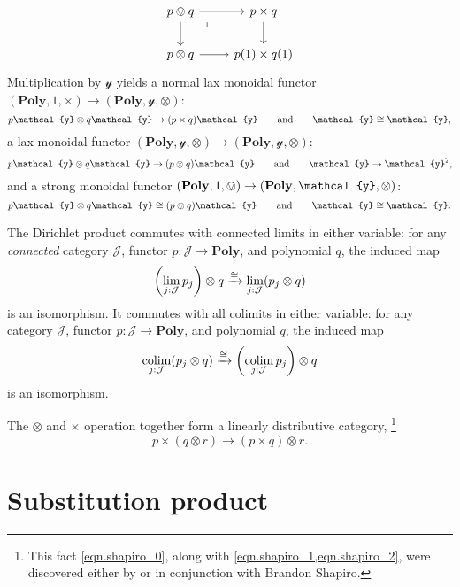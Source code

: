 \documentclass[11pt, one side, article]{memoir}
\theoremstyle{definition}
\theoremstyle{plain}
\DeclareMathOperator*{\colim}{colim}
\newcommand{\cat}[1]{\mathcal{#1}}%
\newcommand{\Cat}[1]{\mathbf{#1}}%
\newcommand{\To}[2][]{\xrightarrow[#1]{\tn{$#2$}}}
\newcommand{\tn}[1]{\textnormal{#1}}
\newcommand{\yon}{{\mathcal{y}}}
\newcommand{\poly}{\Cat{Poly}}
\newcommand{\0}{\textsf{0}}
\newcommand{\1}{\tn{\textsf{1}}}
\newcommand{\hh}[2][]{#1 \tn{#2} #1}
\newcommand{\qqand}{\hh[\qquad]{and}}
\begin{document}
\begin{equation}
\begin{tikzcd}
	p\ovee q\ar[r]\ar[d]&
	p\times q\ar[d]\\
	p\otimes q\ar[r]&
	p(1)\times q(1)\ar[ul, phantom, very near end, "\lrcorner"]
\end{tikzcd}
\end{equation}
Multiplication by $\yon$ yields a normal lax monoidal functor $(\poly,1,\times)\to(\poly,\yon,\otimes)$: 
\begin{equation}\label{eqn.lax_times_tensor}
	p\yon\otimes q\yon\to (p\times q)\yon
	\qqand
	\yon\cong \yon,
\end{equation}
a lax monoidal functor $(\poly,\yon,\otimes)\to(\poly,\yon,\otimes)$:
\begin{equation}
	p\yon\otimes q\yon\to (p\otimes q)\yon
	\qqand
	\yon\to\yon^2,
\end{equation}
and a strong monoidal functor $(\poly,1,\ovee)\to(\poly,\yon,\otimes)$:
\begin{equation}
	p\yon\otimes q\yon\cong (p\ovee q)\yon
	\qqand
	\yon\cong \yon.
\end{equation}


The Dirichlet product commutes with connected limits in either variable: for any \emph{connected} category $\cat{J}$, functor $p\colon\cat{J}\to\poly$, and polynomial $q$, the induced map
\begin{equation}\label{eqn.tensor_limits}
	\left(\lim_{j:\cat{J}}p_j\right)\otimes q
	\To{\cong}
	\lim_{j:\cat{J}}(p_j\otimes q)
\end{equation}
is an isomorphism. It commutes with all colimits in either variable: for any category $\cat{J}$, functor $p\colon\cat{J}\to\poly$, and polynomial $q$, the induced map
\begin{equation}
	\colim_{j:\cat{J}}(p_j\otimes q)
	\To{\cong}
	\left(\colim_{j:\cat{J}}p_j\right)\otimes q
\end{equation}
is an isomorphism.

The $\otimes$ and $\times$ operation together form a linearly distributive category,%
\footnote{This fact \eqref{eqn.shapiro_0}, along with \cref{eqn.shapiro_1,eqn.shapiro_2}, were discovered either by or in conjunction with Brandon Shapiro.}
\begin{equation}\label{eqn.shapiro_0}
p\times(q\otimes r)\to (p\times q)\otimes r.
\end{equation}

\chapter{Substitution product}
\end{document}
